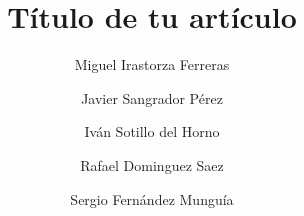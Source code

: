 \documentclass[sigconf]{acmart}
\title{Título de tu artículo}
\author{Miguel Irastorza Ferreras}
\author{Javier Sangrador Pérez}
\author{Iván Sotillo del Horno}
\author{Rafael Dominguez Saez}
\author{Sergio Fernández Munguía}
\begin{document}
\begin{abstract}
    
\end{abstract}
\maketitle









\end{document}
